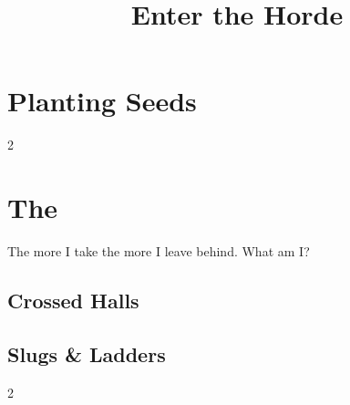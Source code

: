 \documentclass[a4paper,openany]{book}
\title{Enter the Horde}
\begin{document}
\glsunsetall
{}







\mainmatter

\glsresetall


\chapter{Planting Seeds}

\begin{multicols}{2}



\end{multicols}

\stopcontents[segments]

%

\chapter{The }
\epigraph{%
    The more I take the more I leave behind.
    What am I?
}{}

\section{Crossed Halls}



\section{Slugs \& Ladders}

\begin{multicols}{2}



\warrenMap





\end{multicols}

\startappendix





\cleardoublepage
\end{document}
